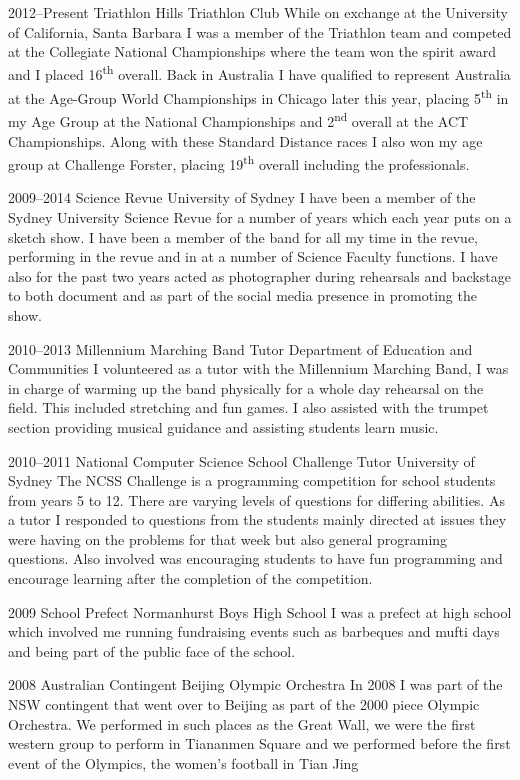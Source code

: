 \cventry
{2012--Present}
{Triathlon}
{Hills Triathlon Club}
{}{}
{While on exchange at the University of California, Santa Barbara I was a member of the Triathlon team and competed at the Collegiate National Championships where the team won the spirit award and I placed 16\textsuperscript{th} overall. Back in Australia I have qualified to represent Australia at the Age-Group World Championships in Chicago later this year, placing 5\textsuperscript{th} in my Age Group at the National Championships and 2\textsuperscript{nd} overall at the ACT Championships. Along with these Standard Distance races I also won my age group at Challenge Forster, placing 19\textsuperscript{th} overall including the professionals.}

\cventry
{2009--2014}
{Science Revue}
{University of Sydney}
{}{}
{I have been a member of the Sydney University Science Revue for a number of years which each year puts on a sketch show. I have been a member of the band for all my time in the revue, performing in the revue and in at a number of Science Faculty functions. I have also for the past two years acted as photographer during rehearsals and backstage to both document and as part of the social media presence in promoting the show.
}

\cventry
{2010--2013}
{Millennium Marching Band Tutor}
{Department of Education and Communities}
{}{}
{I volunteered as a tutor with the Millennium Marching Band, I was in charge of warming up the band physically for a whole day rehearsal on the field. This included stretching and fun games. I also assisted with the trumpet section providing musical guidance and assisting students learn music.}

\cventry
{2010--2011}
{National Computer Science School Challenge Tutor}
{University of Sydney}
{}{}
{The NCSS Challenge is a programming competition for school students from years 5 to 12. There are varying levels of questions for differing abilities. As a tutor I responded to questions from the students mainly directed at issues they were having on the problems for that week but also general programing questions. Also involved was encouraging students to have fun programming and encourage learning after the completion of the competition.}

\cventry
{2009}
{School Prefect}
{Normanhurst Boys High School}
{}{}
{I was a prefect at high school which involved me running fundraising events such as barbeques and mufti days and being part of the public face of the school.}

\cventry
{2008}
{Australian Contingent}
{Beijing Olympic Orchestra}
{}{}
{In 2008 I was part of the NSW contingent that went over to Beijing as part of the 2000 piece Olympic Orchestra. We performed in such places as the Great Wall, we were the first western group to perform in Tiananmen Square and we performed before the first event of the Olympics, the women's football in Tian Jing}

